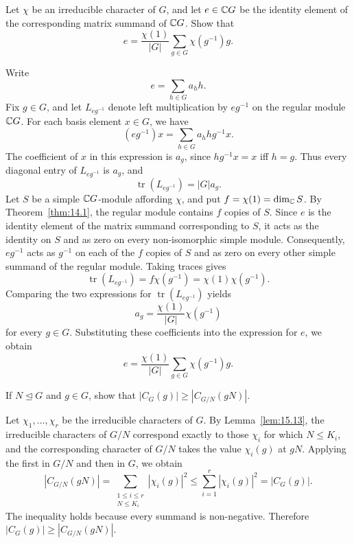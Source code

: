 \documentclass[../Odyssey_Project.tex]{subfiles}
\begin{document}
\begin{exercise}
\label{ex:15.6}
Let $\chi$ be an irreducible character of $G$, and let $e \in \mathbb{C} G$ be the identity element of the corresponding matrix summand of $\mathbb{C} G$. Show that
\[
    e = \frac{\chi(1)}{|G|} \sum_{g \in G} \chi(g^{-1}) g.
\]
\end{exercise}
\begin{solution}
    Write
    \[
        e=\sum_{h\in G}a_hh.
    \]
    Fix $g\in G$, and let $L_{eg^{-1}}$ denote left multiplication by $eg^{-1}$ on the regular module $\mathbb{C} G$. For each basis element $x\in G$, we have
    \[
        (eg^{-1})x=\sum_{h\in G}a_hhg^{-1}x.
    \]
    The coefficient of $x$ in this expression is $a_g$, since $hg^{-1}x=x$ iff $h=g$. Thus every diagonal entry of $L_{eg^{-1}}$ is $a_g$, and
    \[
        \operatorname{tr}(L_{eg^{-1}})=|G|a_g.
    \]
    Let $S$ be a simple $\mathbb{C} G$-module affording $\chi$, and put $f=\chi(1)=\dim_{\mathbb{C}}S$. By Theorem~\ref{thm:14.1}, the regular module contains $f$ copies of $S$. Since $e$ is the identity element of the matrix summand corresponding to $S$, it acts as the identity on $S$ and as zero on every non-isomorphic simple module. Consequently, $eg^{-1}$ acts as $g^{-1}$ on each of the $f$ copies of $S$ and as zero on every other simple summand of the regular module. Taking traces gives
    \[
        \operatorname{tr}(L_{eg^{-1}})=f\chi(g^{-1})=\chi(1)\chi(g^{-1}).
    \]
    Comparing the two expressions for $\operatorname{tr}(L_{eg^{-1}})$ yields
    \[
        a_g=\frac{\chi(1)}{|G|}\chi(g^{-1})
    \]
    for every $g\in G$. Substituting these coefficients into the expression for $e$, we obtain
    \[
        e=\frac{\chi(1)}{|G|}\sum_{g\in G}\chi(g^{-1})g.
    \]
\end{solution}

\begin{exercise}
\label{ex:15.7}
If $N \trianglelefteq G$ and $g \in G$, show that $|C_G(g)| \geq |C_{G/N}(gN)|$.
\end{exercise}
\begin{solution}
    Let $\chi_1,\ldots,\chi_r$ be the irreducible characters of $G$. By Lemma~\ref{lem:15.13}, the irreducible characters of $G/N$ correspond exactly to those $\chi_i$ for which $N\leq K_i$, and the corresponding character of $G/N$ takes the value $\chi_i(g)$ at $gN$. Applying the  first in $G/N$ and then in $G$, we obtain
    \[
        |C_{G/N}(gN)|
        =
        \sum_{\substack{1\leq i\leq r\\N\leq K_i}}|\chi_i(g)|^2
        \leq
        \sum_{i=1}^{r}|\chi_i(g)|^2
        =
        |C_G(g)|.
    \]
    The inequality holds because every summand is non-negative. Therefore $|C_G(g)|\geq|C_{G/N}(gN)|$.
\end{solution}
\end{document}

